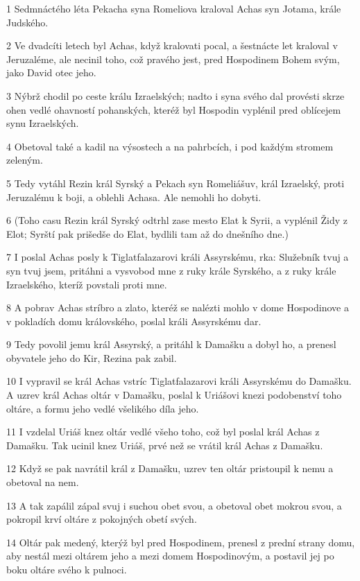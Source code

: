 \par 1 Sedmnáctého léta Pekacha syna Romeliova kraloval Achas syn Jotama, krále Judského.
\par 2 Ve dvadcíti letech byl Achas, když kralovati pocal, a šestnácte let kraloval v Jeruzaléme, ale necinil toho, což pravého jest, pred Hospodinem Bohem svým, jako David otec jeho.
\par 3 Nýbrž chodil po ceste králu Izraelských; nadto i syna svého dal provésti skrze ohen vedlé ohavností pohanských, kteréž byl Hospodin vyplénil pred oblícejem synu Izraelských.
\par 4 Obetoval také a kadil na výsostech a na pahrbcích, i pod každým stromem zeleným.
\par 5 Tedy vytáhl Rezin král Syrský a Pekach syn Romeliášuv, král Izraelský, proti Jeruzalému k boji, a oblehli Achasa. Ale nemohli ho dobyti.
\par 6 (Toho casu Rezin král Syrský odtrhl zase mesto Elat k Syrii, a vyplénil Židy z Elot; Syrští pak prišedše do Elat, bydlili tam až do dnešního dne.)
\par 7 I poslal Achas posly k Tiglatfalazarovi králi Assyrskému, rka: Služebník tvuj a syn tvuj jsem, pritáhni a vysvobod mne z ruky krále Syrského, a z ruky krále Izraelského, kteríž povstali proti mne.
\par 8 A pobrav Achas stríbro a zlato, kteréž se nalézti mohlo v dome Hospodinove a v pokladích domu královského, poslal králi Assyrskému dar.
\par 9 Tedy povolil jemu král Assyrský, a pritáhl k Damašku a dobyl ho, a prenesl obyvatele jeho do Kir, Rezina pak zabil.
\par 10 I vypravil se král Achas vstríc Tiglatfalazarovi králi Assyrskému do Damašku. A uzrev král Achas oltár v Damašku, poslal k Uriášovi knezi podobenství toho oltáre, a formu jeho vedlé všelikého díla jeho.
\par 11 I vzdelal Uriáš knez oltár vedlé všeho toho, což byl poslal král Achas z Damašku. Tak ucinil knez Uriáš, prvé než se vrátil král Achas z Damašku.
\par 12 Když se pak navrátil král z Damašku, uzrev ten oltár pristoupil k nemu a obetoval na nem.
\par 13 A tak zapálil zápal svuj i suchou obet svou, a obetoval obet mokrou svou, a pokropil krví oltáre z pokojných obetí svých.
\par 14 Oltár pak medený, kterýž byl pred Hospodinem, prenesl z prední strany domu, aby nestál mezi oltárem jeho a mezi domem Hospodinovým, a postavil jej po boku oltáre svého k pulnoci.
